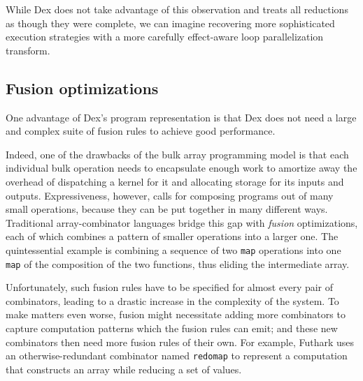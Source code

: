 \documentclass[acmsmall,screen,nonacm]{acmart}
\begin{document}
While Dex does not take advantage of this observation and treats all reductions as though they were complete, we can imagine recovering more sophisticated execution strategies with a more carefully effect-aware loop parallelization transform.

\subsection{Fusion optimizations}
\label{sec:fusion}

One advantage of Dex's program representation is that Dex does not need a large and complex suite of fusion rules to achieve good performance.

Indeed, one of the drawbacks of the bulk array programming model is that each individual bulk operation needs to encapsulate enough work to amortize away the overhead of dispatching a kernel for it and allocating storage for its inputs and outputs.
Expressiveness, however, calls for composing programs out of many small operations, because they can be put together in many different ways.
Traditional array-combinator languages bridge this gap with \emph{fusion} optimizations, each of which combines a pattern of smaller operations into a larger one.
The quintessential example is combining a sequence of two \texttt{map} operations into one \texttt{map} of the composition of the two functions, thus eliding the intermediate array.

Unfortunately, such fusion rules have to be specified for almost every pair of combinators, leading to a drastic increase in the complexity of the system.
To make matters even worse, fusion might necessitate adding more combinators to capture computation patterns which the fusion rules can emit; and these new combinators then need more fusion rules of their own.
For example, Futhark uses an otherwise-redundant combinator named \texttt{redomap} \citep{henriksen2016design} to represent a computation that constructs an array while reducing a set of values.
\end{document}

